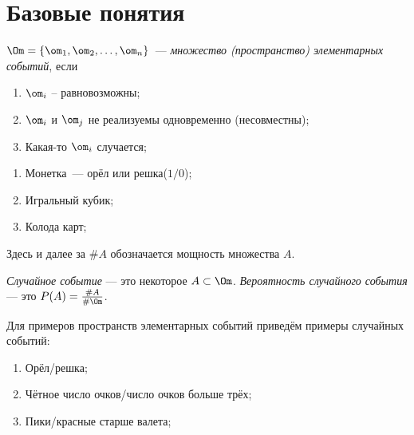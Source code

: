 \section{Базовые понятия}

 \begin{definition}
     $\Om = \{\om_1, \om_2, \ldots, \om_n\}$~--- \textit{множество (пространство) элементарных событий}, если
     \begin{enumerate}
         \item $\om_i$ -- равновозможны;
         \item $\om_i$ и $\om_j$ не реализуемы одновременно (несовместны);
         \item Какая-то $\om_i$ случается;
     \end{enumerate}
 \end{definition}

 \begin{examples}
    \enewline
     \begin{enumerate}
         \item Монетка~--- орёл или решка($1/0$);
         \item Игральный кубик;
         \item Колода карт;
     \end{enumerate}
 \end{examples}
Здесь и далее за $\#A$ обозначается мощность множества $A$.
 \begin{definition}
    \textit{Случайное событие} --- это некоторое $A \subset \Om$.
    \textit{Вероятность случайного события} --- это $P(A)= \frac{\#A}{\#\Om}$.
 \end{definition}

Для примеров пространств элементарных событий приведём примеры случайных событий: 
 \begin{examples}
 \enewline
     \begin{enumerate}
         \item Орёл/решка;
         \item Чётное число очков/число очков больше трёх;
         \item Пики/красные старше валета;
     \end{enumerate}
 \end{examples}

